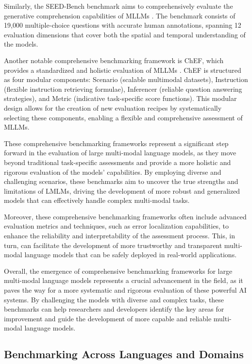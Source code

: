 \documentclass[11pt]{article}
\begin{document}
Similarly, the SEED-Bench benchmark aims to comprehensively evaluate the generative comprehension capabilities of MLLMs \cite{ref46}. The benchmark consists of 19,000 multiple-choice questions with accurate human annotations, spanning 12 evaluation dimensions that cover both the spatial and temporal understanding of the models.

Another notable comprehensive benchmarking framework is ChEF, which provides a standardized and holistic evaluation of MLLMs \cite{ref54}. ChEF is structured as four modular components: Scenario (scalable multimodal datasets), Instruction (flexible instruction retrieving formulae), Inferencer (reliable question answering strategies), and Metric (indicative task-specific score functions). This modular design allows for the creation of new evaluation recipes by systematically selecting these components, enabling a flexible and comprehensive assessment of MLLMs.

These comprehensive benchmarking frameworks represent a significant step forward in the evaluation of large multi-modal language models, as they move beyond traditional task-specific assessments and provide a more holistic and rigorous evaluation of the models' capabilities. By employing diverse and challenging scenarios, these benchmarks aim to uncover the true strengths and limitations of LMLMs, driving the development of more robust and generalized models that can effectively handle complex multi-modal tasks.

Moreover, these comprehensive benchmarking frameworks often include advanced evaluation metrics and techniques, such as error localization capabilities, to enhance the reliability and interpretability of the assessment process. This, in turn, can facilitate the development of more trustworthy and transparent multi-modal language models that can be safely deployed in real-world applications.

Overall, the emergence of comprehensive benchmarking frameworks for large multi-modal language models represents a crucial advancement in the field, as it paves the way for a more systematic and rigorous evaluation of these powerful AI systems. By challenging the models with diverse and complex tasks, these benchmarks can help researchers and developers identify the key areas for improvement and guide the development of more capable and reliable multi-modal language models.

\subsection{Benchmarking Across Languages and Domains}
\end{document}
